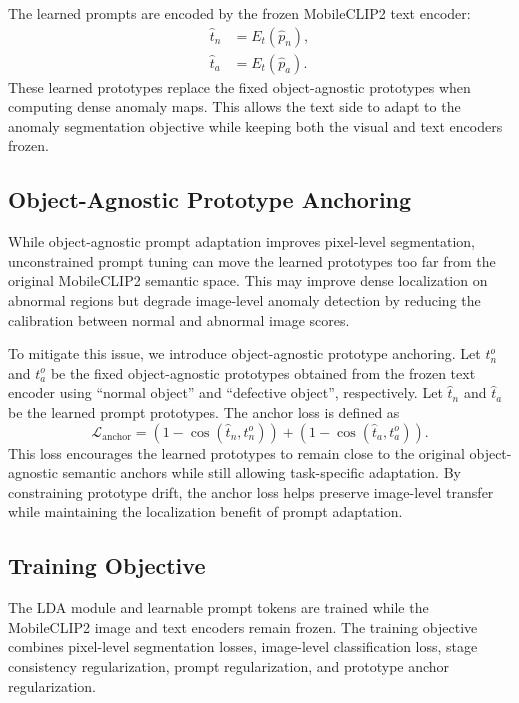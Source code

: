 \documentclass[10pt]{article}
\begin{document}
The learned prompts are encoded by the frozen MobileCLIP2 text encoder:
\begin{align}
\hat{t}_n &= E_t(\hat{p}_n), \\
\hat{t}_a &= E_t(\hat{p}_a).
\label{eq:object_learned_proto}
\end{align}
These learned prototypes replace the fixed object-agnostic prototypes when computing dense anomaly maps. This allows the text side to adapt to the anomaly segmentation objective while keeping both the visual and text encoders frozen.

\subsection{Object-Agnostic Prototype Anchoring}

While object-agnostic prompt adaptation improves pixel-level segmentation, unconstrained prompt tuning can move the learned prototypes too far from the original MobileCLIP2 semantic space. This may improve dense localization on abnormal regions but degrade image-level anomaly detection by reducing the calibration between normal and abnormal image scores.

To mitigate this issue, we introduce object-agnostic prototype anchoring. Let $t_n^{o}$ and $t_a^{o}$ be the fixed object-agnostic prototypes obtained from the frozen text encoder using ``normal object'' and ``defective object'', respectively. Let $\hat{t}_n$ and $\hat{t}_a$ be the learned prompt prototypes. The anchor loss is defined as
\begin{equation}
\mathcal{L}_{\mathrm{anchor}}
=
\left(1 - \cos(\hat{t}_n, t_n^{o})\right)
+
\left(1 - \cos(\hat{t}_a, t_a^{o})\right).
\label{eq:object_anchor}
\end{equation}
This loss encourages the learned prototypes to remain close to the original object-agnostic semantic anchors while still allowing task-specific adaptation. By constraining prototype drift, the anchor loss helps preserve image-level transfer while maintaining the localization benefit of prompt adaptation.

\subsection{Training Objective}

The LDA module and learnable prompt tokens are trained while the MobileCLIP2 image and text encoders remain frozen. The training objective combines pixel-level segmentation losses, image-level classification loss, stage consistency regularization, prompt regularization, and prototype anchor regularization.
\end{document}
